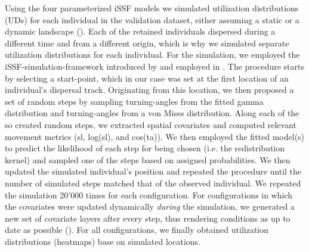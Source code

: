 \documentclass[abstract=on,10pt,a4paper,bibliography=totocnumbered]{article}
\begin{document}
Using the four parameterized iSSF models we simulated utilization distributions
(UDs) for each individual in the validation dataset, either assuming a static or
a dynamic landscape (). Each of the retained individuals
dispersed during a different time and from a different origin, which is why we
simulated separate utilization distributions for each individual. For the
simulation, we employed the iSSF-simulation-framework introduced by
\citet{Signer.2017} and employed in \citet{Hofmann.2023}. The procedure starts
by selecting a start-point, which in our case was set at the first location of
an individual's dispersal track. Originating from this location, we then
proposed a set of random steps by sampling turning-angles from the fitted gamma
distribution and turning-angles from a von Mises distribution. Along each of the
so created random steps, we extracted spatial covariates and computed relevant
movement metrics (sl, log(sl), and cos(ta)). We then employed the fitted
model(s) to predict the likelihood of each step for being chosen (i.e. the
redistribution kernel) and sampled one of the steps based on assigned
probabilities. We then updated the simulated individual's position and repeated
the procedure until the number of simulated steps matched that of the observed
individual. We repeated the simulation 20'000 times for each configuration. For
configurations in which the covariates were updated dynamically \textit{during}
the simulation, we generated a new set of covariate layers after every step,
thus rendering conditions as up to date as possible (). For all
configurations, we finally obtained utilization distributions (heatmaps) base on
simulated locations.
\end{document}
